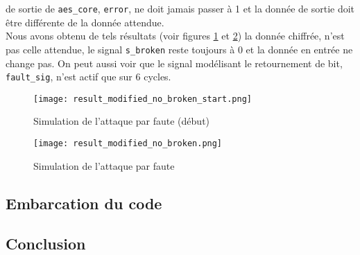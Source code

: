 de sortie de \texttt{aes\_core}, \texttt{error}, ne doit jamais passer à 1 et
la donnée de sortie doit être différente de la donnée attendue. \\
Nous avons obtenu de tels résultats (voir figures \ref{modified_start} et
\ref{modified}) la donnée chiffrée, n'est pas celle attendue, le signal
\texttt{s\_broken} reste toujours à 0 et la donnée en entrée ne change pas. On peut
aussi voir que le signal modélisant le retournement de bit, \texttt{fault\_sig},
n'est actif que sur 6 cycles.
\begin{figure}[htbp]
	\begin{center}
		\texttt{[image: result\_modified\_no\_broken\_start.png]}
		\caption{Simulation de l'attaque par faute (début)}
		\label{modified_start}
	\end{center}
\end{figure}
\begin{figure}[htbp]
	\begin{center}
		\texttt{[image: result\_modified\_no\_broken.png]}
		\caption{Simulation de l'attaque par faute}
		\label{modified}
	\end{center}
\end{figure}

\subsection{Embarcation du code}


\subsection{Conclusion}
